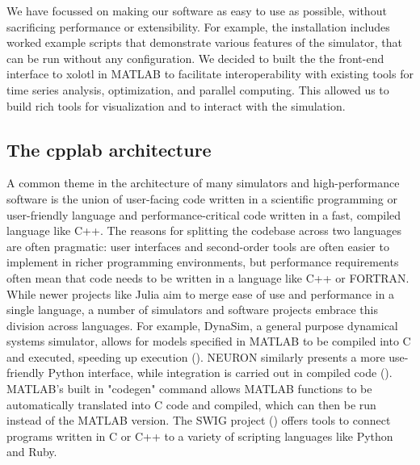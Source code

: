 \documentclass{frontiersSCNS} %
\begin{document}
We have focussed on making our software as easy to use as possible, without sacrificing performance or extensibility. For example, the installation includes worked example scripts that demonstrate various features of the simulator, that can be run without any configuration.  We decided to built the the front-end interface to xolotl in MATLAB to facilitate interoperability with existing tools for time series analysis, optimization, and parallel computing. This allowed us to build rich tools for visualization and to interact with the simulation.

\begin{tcolorbox}[breakable,notitle,boxrule=0pt,colback=yellow,colframe=yellow]

\subsection{The cpplab architecture}

A common theme in the architecture of many simulators and high-performance software is the union of user-facing code written in a scientific programming or user-friendly language and performance-critical code written in a fast, compiled language like C++. The reasons for splitting the codebase across two languages are often pragmatic: user interfaces and second-order tools are often easier to implement in richer programming environments, but performance requirements often mean that code needs to be written in a language like C++ or FORTRAN. While newer projects like Julia aim to merge ease of use and performance in a single language, a number of simulators and software projects embrace this division across languages.  For example, DynaSim, a general purpose dynamical systems simulator, allows for models specified in MATLAB to be compiled into C and executed, speeding up execution (\cite{sherfeyDynaSimMATLABToolbox2018}). NEURON similarly presents a more use-friendly Python interface, while integration is carried out in compiled code (\cite{hinesNEURONSimulationEnvironment1997}). MATLAB's built in "codegen" command allows MATLAB functions to be automatically translated into C code and compiled, which can then be run instead of the MATLAB version. The SWIG project (\cite{beazley1996swig}) offers tools to connect programs written in C or C++ to a variety of scripting languages like Python and Ruby.

\end{tcolorbox}
\end{document}
